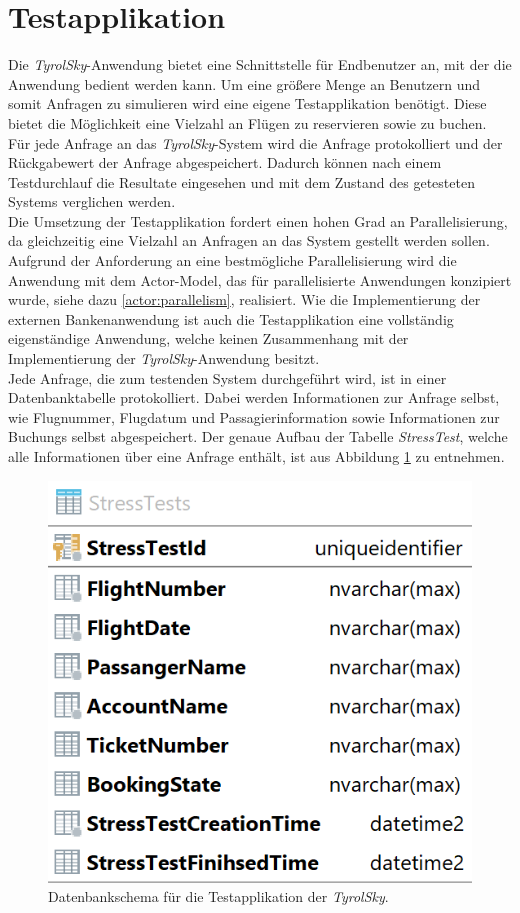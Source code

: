 \section{Testapplikation}
\label{subsec:implementation:TestApplikation} 
Die \textit{TyrolSky}-Anwendung bietet eine Schnittstelle für Endbenutzer an, mit der die Anwendung bedient werden kann. Um eine größere Menge an Benutzern und somit Anfragen zu simulieren wird eine eigene Testapplikation benötigt. Diese bietet die Möglichkeit eine Vielzahl an Flügen zu reservieren sowie zu buchen. Für jede Anfrage an das \textit{TyrolSky}-System wird die Anfrage protokolliert und der Rückgabewert der Anfrage abgespeichert. Dadurch können nach einem Testdurchlauf die Resultate eingesehen und mit dem Zustand des getesteten Systems verglichen werden. \\
Die Umsetzung der Testapplikation fordert einen hohen Grad an Parallelisierung, da gleichzeitig eine Vielzahl an Anfragen an das System gestellt werden sollen. Aufgrund der Anforderung an eine bestmögliche Parallelisierung wird die Anwendung mit dem Actor-Model, das für parallelisierte Anwendungen konzipiert wurde, siehe dazu \ref{actor:parallelism}, realisiert. Wie die Implementierung der externen Bankenanwendung ist auch die Testapplikation eine vollständig eigenständige Anwendung, welche keinen Zusammenhang mit der Implementierung der \textit{TyrolSky}-Anwendung besitzt. \\
Jede Anfrage, die zum testenden System durchgeführt wird, ist in einer Datenbanktabelle protokolliert. Dabei werden Informationen zur Anfrage selbst, wie Flugnummer, Flugdatum und Passagierinformation sowie Informationen zur Buchungs selbst abgespeichert. Der genaue Aufbau der Tabelle \textit{StressTest}, welche alle Informationen über eine Anfrage enthält, ist aus Abbildung \ref{fig:implementation:stressTestDbSchema} zu entnehmen.
\begin{figure}
  \centering
  \includegraphics[width=0.4\linewidth]{gfx/implementation/stressTestDbSchema}
  \caption{Datenbankschema für die Testapplikation der \textit{TyrolSky}.}
  \label{fig:implementation:stressTestDbSchema}
\end{figure} 

